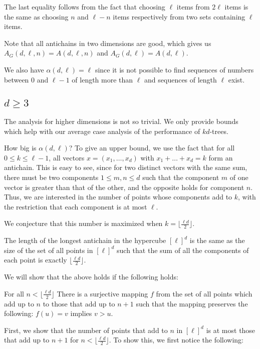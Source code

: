 The last equality follows from the fact that choosing $\ell$ items from $2\ell$ items is the same as choosing $n$ and $\ell-n$ items respectively from two sets containing $\ell$ items. 

Note that all antichains in two dimensions are good, which gives us $A_G(d,\ell,n)=A(d,\ell,n)$ and $A_G(d,\ell)=A(d,\ell)$.

We also have $\alpha(d,\ell)=\ell$ since it is not possible to find sequences of numbers between $0$ and $\ell-1$ of length more than $\ell$ and sequences of length $\ell$ exist.

\subsection{$d\geq3$}

The analysis for higher dimensions is not so trivial. We only provide bounds which help with our average case analysis of the performance of $kd$-trees.

How big is $\alpha(d,\ell)$? To give an upper bound, we use the fact that for all $0\leq k\leq\ell-1$, all vectors $x=(x_1,\dots,x_d)$ with $x_1+\dots+x_d=k$ form an antichain. This is easy to see, since for two distinct vectors with the same sum, there must be two components $1\leq m,n\leq d$ such that the component $m$ of one vector is greater than that of the other, and the opposite holds for component $n$. Thus, we are interested in the number of points whose components add to $k$, with the restriction that each component is at most $\ell$.

We conjecture that this number is maximized when $k=\lfloor\frac{\ell d}{2}\rfloor$.
\begin{theorem}[Conjecture]
    The length of the longest antichain in the hypercube $[\ell]^d$ is the same as the size of the set of all points in $[\ell]^d$ such that the sum of all the components of each point is exactly $\lfloor\frac{\ell d}{2}\rfloor$.
\end{theorem}
We will show that the above holds if the following holds:
\begin{proposition}
    For all $n<\lfloor\frac{\ell d}{2}\rfloor$ There is a surjective mapping $f$ from the set of all points which add up to $n$ to those that add up to $n+1$ such that the mapping preserves the following: $f(u)=v$ implies $v>u$.
\end{proposition}

First, we show that the number of points that add to $n$ in $[\ell]^d$ is at most those that add up to $n+1$ for $n<\lfloor\frac{\ell d}{2}\rfloor$. To show this, we first notice the following:

\begin{lemma}
    
\end{lemma}
